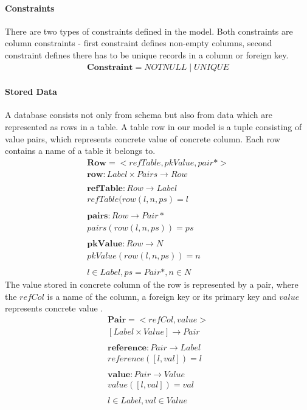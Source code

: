 \documentclass[11pt]{article}
\begin{document}
\paragraph{Constraints} There are two types of constraints defined in the model. Both constraints are column constraints - first constraint defines non-empty columns, second constraint defines there has to be unique records in a column or foreign key.
\begin{align*}
	\mathbf{Constraint} = NOTNULL \; | \; UNIQUE 
\end{align*}


\paragraph{Stored Data} A database consists not only from schema but also from data which are represented as rows in a table. A table row in our model is a tuple consisting of value pairs, which represents concrete value of concrete column. Each row contains a name of a table it belongs to.
\begin{align*}
	\mathbf{Row} = < refTable, pkValue, pair* > \\
	\mathbf{row} : Label \times Pairs \rightarrow Row \\ \\
	\mathbf{refTable} : Row \rightarrow Label \\
	refTable(row(l, n, ps) = l \\ \\
	\mathbf{pairs} : Row \rightarrow Pair* \\
	pairs(row(l, n, ps)) = ps \\ \\
	\mathbf{pkValue} : Row \rightarrow N \\
	pkValue(row(l, n, ps)) = n \\ \\
	 l \in Label, ps = Pair*, n \in N
\end{align*}
The value stored in concrete column of the row is represented by a pair, where the $refCol$ is a name of the column, a foreign key or its primary key and $value$ represents concrete value .
\begin{align*}
	\mathbf{Pair} = < refCol, value > \\
	[Label \times Value] \rightarrow Pair\\ \\
	\mathbf{reference} : Pair \rightarrow Label \\
	reference([l,val]) = l \\ \\
	\mathbf{value} : Pair \rightarrow Value \\ 
	value([l,val]) = val \\ \\
	l \in Label, val \in Value
\end{align*}
\end{document}
